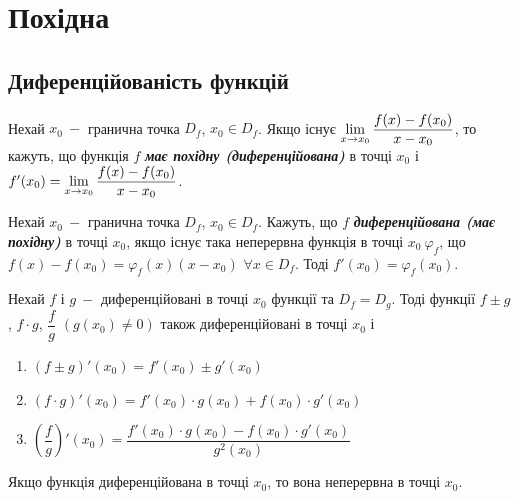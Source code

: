 
\section{\Large{Похідна}}

\subsection{\large{Диференційованість функцій}} 

\begin{definition}

         Нехай $x_0 \: - $ гранична точка $D_f$, $x_0 \in D_f$. Якщо існує $\displaystyle\lim\limits_{x \to x_0} \dfrac{f(x) - f(x_0)}{x - x_0}$, то кажуть, що функція $f$ \textcolor{NavyBlue}{\textbf{\textit{має  похідну (диференційована)}}} в точці $x_0$ і ${f}'(x_0) = \displaystyle\lim\limits_{x \to x_0} \dfrac{f(x) - f(x_0)}{x - x_0}$.
\end{definition}

\begin{definition}[за Ферма]
         Нехай $x_0 \: - $ гранична точка $D_f$, $x_0 \in D_f$. Кажуть, що $f$ \textcolor{NavyBlue}{\textbf{\textit{диференційована (має похідну)}}} в точці $x_0$, якщо існує така неперервна функція в точці $x_0 \ \varphi_f$, що $f(x) - f(x_0) = \varphi_f(x) (x - x_0)$  $\forall x \in D_f$. Тоді $f'(x_0) = \varphi_f(x_0)$.
\end{definition}

\begin{theorem}
        Нехай $f$ і $g \: -$ диференційовані в точці $x_0$ функції та $D_f = D_g$. Тоді функції $f \pm g$, $f \cdot g$, $\dfrac{f}{g}$  $(g(x_0) \neq 0)$ також диференційовані в точці $x_0$ і
        \begin{enumerate}
            \item $(f \pm g)'(x_0) = f'(x_0) \pm g'(x_0)$
            \item $(f \cdot g)'(x_0) = f'(x_0) \cdot g(x_0) + f(x_0) \cdot g'(x_0)$
            \item $\left(\dfrac{f}{g}\right)'(x_0) = \dfrac{f'(x_0) \cdot g(x_0) - f(x_0) \cdot g'(x_0)}{g^2(x_0)}$
        \end{enumerate}
\end{theorem}

\begin{theorem}
        Якщо функція диференційована в точці $x_0$, то вона неперервна в точці $x_0$.
\end{theorem}

